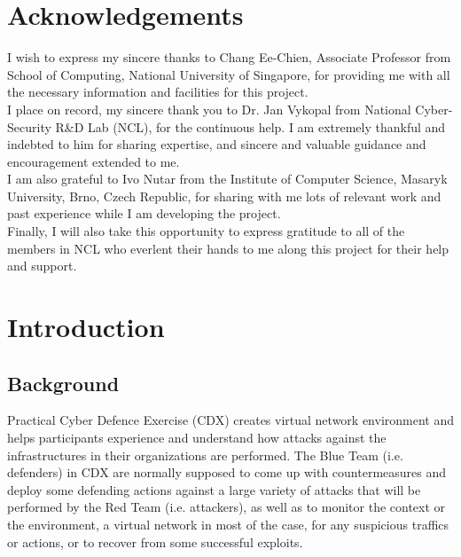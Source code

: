 \documentclass[12pt]{report}
\begin{document}
\chapter*{Acknowledgements}
\thispagestyle{empty}
\begin{spacing}{2}
\setlength{\parindent}{0pt} I wish to express my sincere thanks to Chang Ee-Chien, Associate Professor from School of
Computing, National University of Singapore, for providing me with all the necessary information and facilities for this project.\\

\setlength{\parindent}{0pt} I place on record, my sincere thank you to Dr. Jan Vykopal from National Cyber-Security R\&D Lab (NCL), for the continuous help. I am extremely thankful and indebted to him for sharing expertise, and sincere and valuable guidance and encouragement extended to me.\\

\setlength{\parindent}{0pt} I am also grateful to Ivo Nutar from the Institute of Computer Science, Masaryk University, Brno, Czech Republic, for sharing with me lots of relevant work and past experience while I am developing the project.\\

\setlength{\parindent}{0pt} Finally, I will also take this opportunity to express gratitude to all of the members in NCL who everlent their hands to me along this project for their help and support.\\
\end{spacing}
\clearpage

\tableofcontents

\chapter{Introduction}
\section{Background}
Practical Cyber Defence Exercise (CDX) creates virtual network environment and helps participants experience and understand how attacks against the infrastructures in their organizations are performed. The Blue Team (i.e. defenders) in CDX are normally supposed to come up with countermeasures and deploy some defending actions against a large variety of attacks that will be performed by the Red Team (i.e. attackers), as well as to monitor the context or the environment, a virtual network in most of the case, for any suspicious traffics or actions, or to recover from some successful exploits.\\
\end{document}

